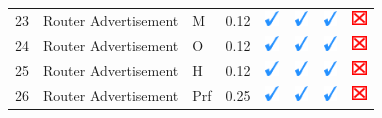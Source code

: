 \documentclass[12pt]{article}
\begin{document}
\begin{savenotes}
\begin{table}[!h]
{{\begin{tabular}{|C{1.0cm}|L{5.0cm}|L{5.0cm}|C{2.0cm}|C{1.0cm}|C{1.0cm}|C{1.0cm}|C{1.0cm}|}
23&Router Advertisement&M&0.12&\includegraphics[width=4mm, height=4mm]{ok}&\includegraphics[width=4mm, height=4mm]{ok}&\includegraphics[width=4mm, height=4mm]{ok}&\includegraphics[width=4mm, height=4mm]{notok}\\
24&Router Advertisement&O&0.12&\includegraphics[width=4mm, height=4mm]{ok}&\includegraphics[width=4mm, height=4mm]{ok}&\includegraphics[width=4mm, height=4mm]{ok}&\includegraphics[width=4mm, height=4mm]{notok}\\
25&Router Advertisement&H&0.12&\includegraphics[width=4mm, height=4mm]{ok}&\includegraphics[width=4mm, height=4mm]{ok}&\includegraphics[width=4mm, height=4mm]{ok}&\includegraphics[width=4mm, height=4mm]{notok}\\
26&Router Advertisement&Prf&0.25&\includegraphics[width=4mm, height=4mm]{ok}&\includegraphics[width=4mm, height=4mm]{ok}&\includegraphics[width=4mm, height=4mm]{ok}&\includegraphics[width=4mm, height=4mm]{notok}\\

\end{tabular}}}
\end{table}
\end{savenotes}
\end{document}
